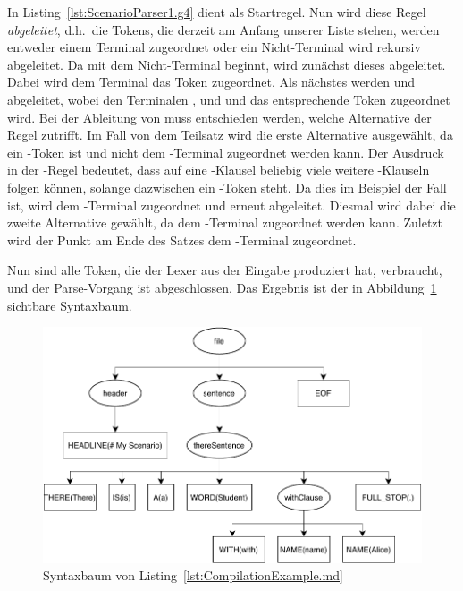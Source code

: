 In Listing~\ref{lst:ScenarioParser1.g4} dient  als Startregel.
Nun wird diese Regel \emph{abgeleitet}, d.h.\ die Tokens, die derzeit am Anfang unserer Liste stehen, werden entweder einem Terminal zugeordnet oder ein Nicht-Terminal wird rekursiv abgeleitet.
Da  mit dem Nicht-Terminal  beginnt, wird zunächst dieses abgeleitet.
Dabei wird dem Terminal  das Token  zugeordnet.
Als nächstes werden  und  abgeleitet, wobei den Terminalen ,  und  und  das entsprechende Token zugeordnet wird.
Bei der Ableitung von  muss entschieden werden, welche Alternative der Regel zutrifft.
Im Fall von dem Teilsatz  wird die erste Alternative ausgewählt, da  ein -Token ist und nicht dem -Terminal zugeordnet werden kann.
Der Ausdruck  in der -Regel bedeutet, dass auf eine -Klausel beliebig viele weitere -Klauseln folgen können, solange dazwischen ein -Token steht.
Da dies im Beispiel der Fall ist, wird  dem -Terminal zugeordnet und  erneut abgeleitet.
Diesmal wird dabei die zweite Alternative gewählt, da  dem -Terminal zugeordnet werden kann.
Zuletzt wird der Punkt am Ende des Satzes dem -Terminal zugeordnet.

Nun sind alle Token, die der Lexer aus der Eingabe produziert hat, verbraucht, und der Parse-Vorgang ist abgeschlossen.
Das Ergebnis ist der in Abbildung~\ref{fig:parsetree} sichtbare Syntaxbaum.

\begin{figure}
    \includegraphics[width=\textwidth]{chapter/fulib-scenarios/img/parsetree.pdf}
    \caption{Syntaxbaum von Listing~\ref{lst:CompilationExample.md}}
    \label{fig:parsetree}
\end{figure}

